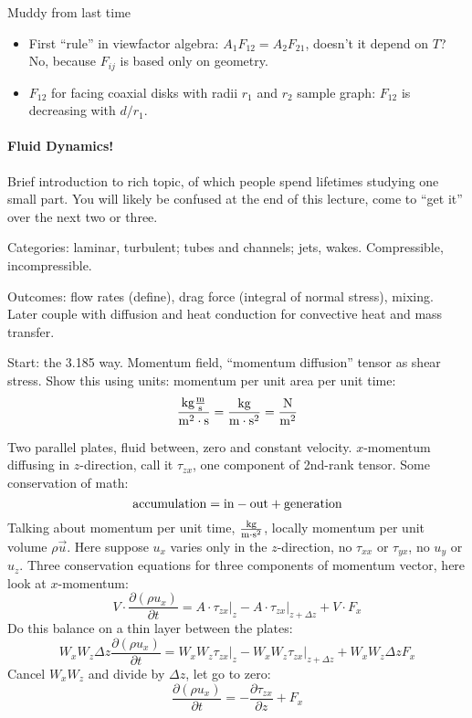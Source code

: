 \documentclass{report}
\begin{document}
\noindent Muddy from last time
\begin{itemize}
\item First ``rule'' in viewfactor algebra: $A_1F_{12}=A_2F_{21}$, doesn't it
  depend on $T$?  No, because $F_{ij}$ is based only on geometry.
\item $F_{12}$ for facing coaxial disks with radii $r_1$ and $r_2$ sample
  graph: $F_{12}$ is decreasing with $d/r_1$.
\end{itemize}

\paragraph{Fluid Dynamics!}

Brief introduction to rich topic, of which people spend lifetimes studying one
small part.  You will likely be confused at the end of this lecture, come to
``get it'' over the next two or three.

Categories: laminar, turbulent; tubes and channels; jets, wakes.  Compressible,
incompressible.

Outcomes: flow rates (define), drag force (integral of normal stress), mixing.
Later couple with diffusion and heat conduction for convective heat and mass
transfer.

Start: the 3.185 way.  Momentum field, ``momentum diffusion'' tensor as shear
stress.  Show this using units: momentum per unit area per unit time:
$$\rm\frac{kg\frac{m}{s}}{m^2\cdot s} = \frac{kg}{m\cdot s^2} = \frac{N}{m^2}$$

Two parallel plates, fluid between, zero and constant velocity.
$x$-momentum diffusing in $z$-direction, call it $\tau_{zx}$, one component of
2nd-rank tensor.  Some conservation of math:
$$\rm accumulation = in - out + generation$$
Talking about momentum per unit time, $\rm\frac{kg}{m\cdot s^2}$, locally
momentum per unit volume $\rho\vec{u}$.  Here suppose $u_x$ varies only in the
$z$-direction, no $\tau_{xx}$ or $\tau_{yx}$, no $u_y$ or $u_z$.  Three
conservation equations for three components of momentum vector, here look at
$x$-momentum:
$$V\cdot \frac{\partial(\rho u_x)}{\partial t} =
\left.A\cdot\tau_{zx}\right|_z - \left.A\cdot\tau_{zx}\right|_{z+\Delta z} +
V\cdot F_x$$
Do this balance on a thin layer between the plates:
$$W_xW_z\Delta z\frac{\partial(\rho u_x)}{\partial t} =
\left.W_xW_z\tau_{zx}\right|_z - \left.W_xW_z\tau_{zx}\right|_{z+\Delta z} +
W_xW_z\Delta z F_x$$
Cancel $W_xW_z$ and divide by $\Delta z$, let go to zero:
$$\frac{\partial(\rho u_x)}{\partial t} =
-\frac{\partial\tau_{zx}}{\partial z} + F_x$$
\end{document}
